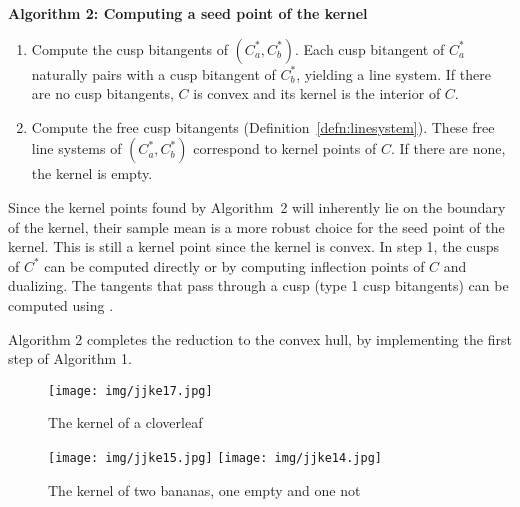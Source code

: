 \documentclass{sig-alternate}
\begin{document}
\vspace{.2in}

\centerline{{\bf Algorithm 2: Computing a seed point of the kernel}}

\begin{enumerate}
\item	Compute the cusp bitangents of $(C_a^*, C_b^*)$.
	Each cusp bitangent of $C^*_a$ naturally pairs with a cusp bitangent
	of $C^*_b$, yielding a line system.
	If there are no cusp bitangents, $C$ is convex and its kernel is the interior of $C$.
\item	Compute the free cusp bitangents (Definition~\ref{defn:linesystem}).
	These free line systems of $(C^*_a, C^*_b)$ correspond
	to kernel points of $C$.
	If there are none, the kernel is empty.
\end{enumerate}

Since the kernel points found by Algorithm~2
will inherently lie on the boundary of the kernel,
their sample mean is a more robust choice for the seed point of the kernel.
This is still a kernel point since the kernel is convex.
In step 1, the cusps of $C^*$ can be computed directly \cite{manocha92}
or by computing inflection points of $C$ and dualizing.
The tangents that pass through a cusp (type 1 cusp bitangents)
can be computed using \cite{jj01ACMSE}.

Algorithm 2 completes the reduction to the convex hull,
by implementing the first step of Algorithm 1.


\begin{figure}[h]
\begin{center}
\texttt{[image: img/jjke17.jpg]}
\end{center}
\caption{The kernel of a cloverleaf}
\label{fig:complex}
\end{figure}

\begin{figure}[h]
\begin{center}
\texttt{[image: img/jjke15.jpg]}
\texttt{[image: img/jjke14.jpg]}
\end{center}
\caption{The kernel of two bananas, one empty and one not}
\label{fig:banana}
\end{figure}

\end{document}
